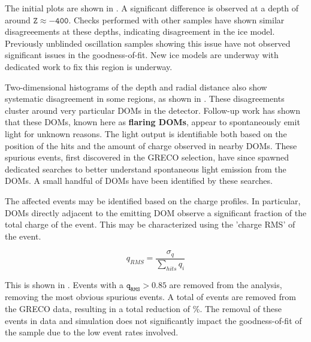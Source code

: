 The initial plots are shown in .
A significant difference is observed at a depth of around $\mathtt{Z\approx -400}$.
Checks performed with other samples have shown similar disagreeements at these depths, indicating disagreement in the ice model.
Previously unblinded oscillation samples showing this issue have not observed significant issues in the goodness-of-fit.
New ice models are underway with dedicated work to fix this region is underway.

Two-dimensional histograms of the depth and radial distance also show systematic disagreement in some regions, as shown in .
These disagreements cluster around very particular DOMs in the detector.
Follow-up work has shown that these DOMs, known here as \textbf{flaring DOMs}, appear to spontaneously emit light for unknown reasons. 
The light output is identifiable both based on the position of the hits and the amount of charge observed in nearby DOMs.
These spurious events, first discovered in the GRECO selection, have since spawned dedicated searches to better understand spontaneous light emission from the DOMs.
A small handful of DOMs have been identified by these searches.

The affected events may be identified based on the charge profiles. 
In particular, DOMs directly adjacent to the emitting DOM observe a significant fraction of the total charge of the event.
This may be characterized using the 'charge RMS' of the event.

\label{eqn:charge_rms}
\begin{equation}
	q_{RMS} = \frac{\sigma_q}{\sum_{hits}{q_i}}
\end{equation}

This is shown in .
Events with a $\mathtt{q_{RMS}}>0.85$ are removed from the analysis, removing the most obvious spurious events. 
A total of  events are removed from the GRECO data, resulting in a total reduction of \%.
The removal of these events in data and simulation does not significantly impact the goodness-of-fit of the sample due to the low event rates involved.

\label{subsubsec:bedrock}
